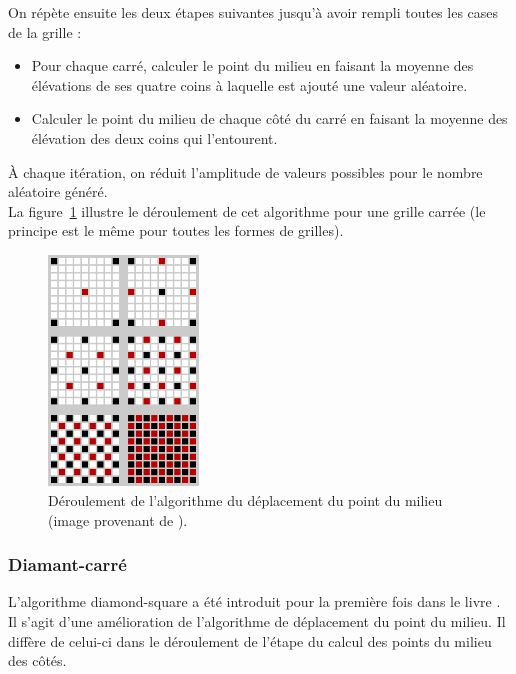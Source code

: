 On répète ensuite les deux étapes suivantes jusqu'à avoir rempli toutes les
cases de la grille :\\

\begin{itemize}
\item Pour chaque carré, calculer le point du milieu en faisant la moyenne
des élévations de ses quatre coins à laquelle est ajouté une valeur aléatoire.

\item Calculer le point du milieu de chaque côté du carré en faisant la moyenne
des élévation des deux coins qui l'entourent.\\
\end{itemize}

\`A chaque itération, on réduit l'amplitude de valeurs possibles pour
le nombre aléatoire généré.\\

La figure~\ref{fig:midpoint-displacement} illustre le déroulement de cet
algorithme pour une grille carrée (le principe est le même pour toutes les formes de grilles).

\begin{figure}[ht]
  \centering
  \includegraphics[width=4cm]{resources/midpoint-displacement.png}
  \caption{Déroulement de l'algorithme du déplacement du point du milieu (image
provenant de \cite{FractalTerrainGeneration}).}
  \label{fig:midpoint-displacement}
\end{figure}

\subsubsection{Diamant-carré}
L'algorithme diamond-square a été introduit pour la première fois dans le livre \cite{Four82}. Il s'agit d'une amélioration de l'algorithme de déplacement du point du
milieu. Il diffère de celui-ci dans le déroulement de l'étape du calcul des points
du milieu des côtés.\\

